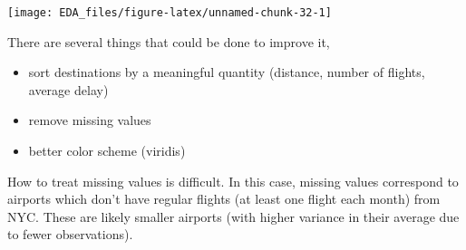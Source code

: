 \documentclass[]{book}
\newenvironment{Shaded}{\begin{snugshade}}{\end{snugshade}}
\newcommand{\DataTypeTok}[1]{\textcolor[rgb]{0.13,0.29,0.53}{#1}}
\newcommand{\KeywordTok}[1]{\textcolor[rgb]{0.13,0.29,0.53}{\textbf{#1}}}
\newcommand{\NormalTok}[1]{#1}
\newcommand{\OperatorTok}[1]{\textcolor[rgb]{0.81,0.36,0.00}{\textbf{#1}}}
\newcommand{\OtherTok}[1]{\textcolor[rgb]{0.56,0.35,0.01}{#1}}
\newcommand{\StringTok}[1]{\textcolor[rgb]{0.31,0.60,0.02}{#1}}
\providecommand{\tightlist}{%
  \setlength{\itemsep}{0pt}\setlength{\parskip}{0pt}}
\theoremstyle{definition}
\theoremstyle{definition}
\theoremstyle{definition}
\theoremstyle{remark}
\begin{document}
\begin{Shaded}
\end{Shaded}

\begin{center}\texttt{[image: EDA\_files/figure-latex/unnamed-chunk-32-1]} \end{center}

There are several things that could be done to improve it,

\begin{itemize}
\tightlist
\item
  sort destinations by a meaningful quantity (distance, number of
  flights, average delay)
\item
  remove missing values
\item
  better color scheme (viridis)
\end{itemize}

How to treat missing values is difficult. In this case, missing values
correspond to airports which don't have regular flights (at least one
flight each month) from NYC. These are likely smaller airports (with
higher variance in their average due to fewer observations).
\end{document}

